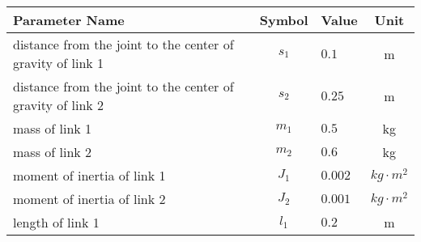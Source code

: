 \begin{tabular}{lclc}
\hline
 Parameter Name                                             &  Symbol  & Value   &      Unit      \\
\hline
 distance from the joint to the center of gravity of link 1 & $s_{1}$  & $0.1$   &       m        \\
 distance from the joint to the center of gravity of link 2 & $s_{2}$  & $0.25$  &       m        \\
 mass of link 1                                             & $m_{1}$  & $0.5$   &       kg       \\
 mass of link 2                                             & $m_{2}$  & $0.6$   &       kg       \\
 moment of inertia of link 1                                & $J_{1}$  & $0.002$ & $kg \cdot m^2$ \\
 moment of inertia of link 2                                & $J_{2}$  & $0.001$ & $kg \cdot m^2$ \\
 length of link 1                                           & $l_{1}$  & $0.2$   &       m        \\
\hline
\end{tabular}